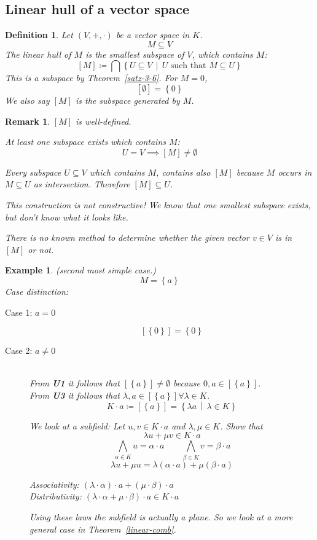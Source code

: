 \documentclass[a4paper,landscape,twocolumn]{article}
\newcommand\set[1]{\left\{#1\right\}}
\newcommand\setdef[2]{\left\{#1\,\middle|\,#2\right\}}
\newtheorem{defi}{Definition}[section]
\newtheorem{ex}{Example}[section]
\newtheorem{rem}{Remark}[section]
\begin{document}
\subsection{Linear hull of a vector space}

\begin{defi}
  Let $(V, +, \cdot)$ be a vector space in $K$.
  \[ M \subseteq V \]
  The linear hull of $M$ is the smallest subspace of $V$, which contains $M$:
  \[ [M] \coloneqq \bigcap\setdef{U \subseteq V}{U \text{ such that } M \subseteq U} \]
  This is a subspace by Theorem~\ref{satz-3-6}.
  For $M = 0$,
  \[ [\emptyset] = \set{0} \]
  We also say $[M]$ is the \emph{subspace generated by $M$}.
\end{defi}

\begin{rem}
  $[M]$ is well-defined.

  At least one subspace exists which contains $M$:
  \[ U = V \implies [M] \neq \emptyset \]

  Every subspace $U \subseteq V$ which contains $M$,
  contains also $[M]$ because $M$ occurs in $M \subseteq U$ as intersection.
  Therefore $[M] \subseteq U$.

  This construction is not constructive!
  We know that one smallest subspace exists, but don't know what it looks like.

  There is no known method to determine whether the given vector $v \in V$ is in
  $[M]$ or not.
\end{rem}

\begin{ex}
  (second most simple case.)
  \[ M = \set{a} \]
  Case distinction:
  \begin{description}
    \item[Case 1: $a = 0$]
      \[ \left[\set{0}\right] = \set{0} \]
    \item[Case 2: $a \neq 0$] \hfill{} \\
      From \textbf{U1} it follows that $\left[\set{a}\right] \neq \emptyset$ because $0,a \in \left[\set{a}\right]$. \\
      From \textbf{U3} it follows that $\lambda,a \in \left[\set{a}\right] \forall \lambda \in K$.
      \[ K\cdot a \coloneqq \left[\set{a}\right] = \setdef{\lambda a}{\lambda \in K} \]

      We look at a subfield:
      Let $u, v \in K \cdot a$ and $\lambda, \mu \in K$. Show that
      \[ \lambda u + \mu v \in K \cdot a \]
      \[
          \bigwedge_{\alpha \in K} u = \alpha \cdot a \qquad
          \bigwedge_{\beta \in K} v = \beta \cdot a
      \]  \[
        \lambda u + \mu u = \lambda (\alpha \cdot a) + \mu (\beta \cdot a)
      \]

      Associativity: $(\lambda \cdot \alpha) \cdot a + (\mu \cdot \beta) \cdot a$ \\
      Distributivity: $(\lambda \cdot \alpha + \mu \cdot \beta) \cdot a \in K \cdot a$

      Using these laws the subfield is actually a plane.
      So we look at a more general case in Theorem~\ref{linear-comb}.
  \end{description}
\end{ex}
\end{document}
